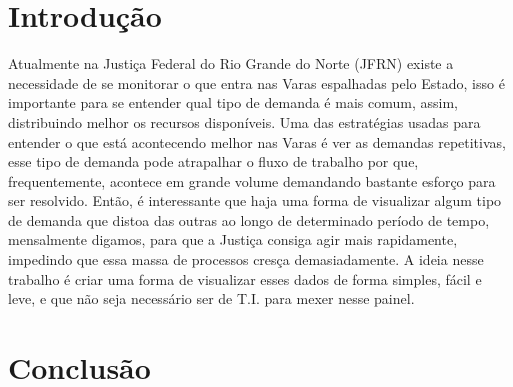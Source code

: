\chapter{Introdução}

Atualmente na Justiça Federal do Rio Grande do Norte (JFRN) existe a necessidade de se monitorar o que entra nas Varas espalhadas pelo Estado, isso é importante para se entender qual tipo de demanda é mais comum, assim, distribuindo melhor os recursos disponíveis. Uma das estratégias usadas para entender o que está acontecendo melhor nas Varas é ver as demandas repetitivas, esse tipo de demanda pode atrapalhar o fluxo de trabalho por que, frequentemente, acontece em grande volume demandando bastante esforço para ser resolvido. Então, é interessante que haja uma forma de visualizar algum tipo de demanda que distoa das outras ao longo de determinado período de tempo, mensalmente digamos, para que a Justiça consiga agir mais rapidamente, impedindo que essa massa de processos cresça demasiadamente. A ideia nesse trabalho é criar uma forma de visualizar esses dados de forma simples, fácil e leve, e que não seja necessário ser de T.I. para mexer nesse painel.





\chapter{Conclusão}
\lipsum[31-33]